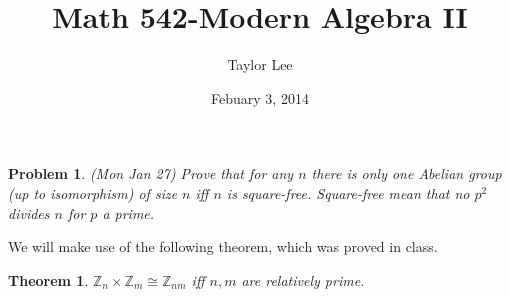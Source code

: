 \documentclass[12pt]{article}
\theoremstyle{moo}
\newtheorem*{prob}{Problem}
\newtheorem*{theorem}{Theorem}
\def\zz{{\mathbb Z}}
\begin{document}
\fontseries {\seriesdefault}
\fontshape {\shapedefault}
\selectfont

\title{ Math 542-Modern Algebra II}
\date{Febuary 3, 2014}         %
\author{Taylor Lee}      %
\maketitle                      %

\begin{prob}
(Mon Jan 27) Prove that for any $n$ there is only one Abelian group (up to 
isomorphism) of size $n$ iff $n$ is square-free.  Square-free
mean that no $p^2$ divides $n$ for $p$ a prime.
\end{prob}

We will make use of the following theorem, which was proved in class.

\begin{theorem}
$\zz_n\times\zz_m \cong \zz_{nm}$ iff $n,m$ are relatively prime.
\end{theorem}
\end{document}
